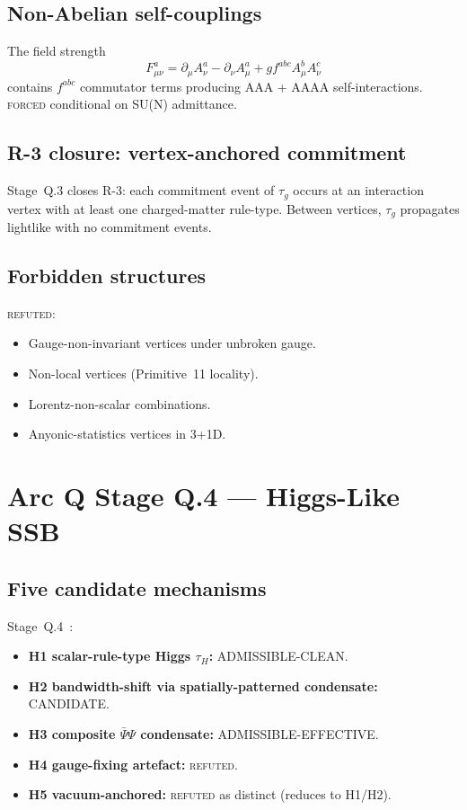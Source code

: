 \documentclass[11pt,a4paper]{article}
\begin{document}
\subsection{Non-Abelian self-couplings}

The field strength
\begin{equation}
F^a_{\mu\nu} = \partial_\mu A^a_\nu - \partial_\nu A^a_\mu + g f^{abc} A^b_\mu A^c_\nu
\end{equation}
contains $f^{abc}$ commutator terms producing AAA + AAAA self-interactions. \textsc{forced} conditional on SU(N) admittance.

\subsection{R-3 closure: vertex-anchored commitment}

Stage~Q.3 closes R-3: each commitment event of $\tau_g$ occurs at an interaction vertex with at least one charged-matter rule-type. Between vertices, $\tau_g$ propagates lightlike with no commitment events.

\subsection{Forbidden structures}

\textsc{refuted}:
\begin{itemize}
  \item Gauge-non-invariant vertices under unbroken gauge.
  \item Non-local vertices (Primitive~11 locality).
  \item Lorentz-non-scalar combinations.
  \item Anyonic-statistics vertices in 3+1D.
\end{itemize}

\section{Arc Q Stage Q.4 --- Higgs-Like SSB}

\subsection{Five candidate mechanisms}

Stage~Q.4~\cite{q4higgs}:
\begin{itemize}
  \item \textbf{H1 scalar-rule-type Higgs $\tau_H$:} ADMISSIBLE-CLEAN.
  \item \textbf{H2 bandwidth-shift via spatially-patterned condensate:} CANDIDATE.
  \item \textbf{H3 composite $\bar\Psi\Psi$ condensate:} ADMISSIBLE-EFFECTIVE.
  \item \textbf{H4 gauge-fixing artefact:} \textsc{refuted}.
  \item \textbf{H5 vacuum-anchored:} \textsc{refuted} as distinct (reduces to H1/H2).
\end{itemize}
\end{document}
